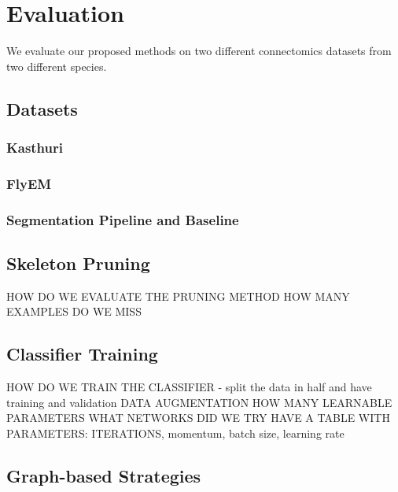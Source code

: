 \section{Evaluation}

We evaluate our proposed methods on two different connectomics datasets from two different species. 

\subsection{Datasets}

\subsubsection{Kasthuri}

\subsubsection{FlyEM}

\subsubsection{Segmentation Pipeline and Baseline}

\subsection{Skeleton Pruning}

HOW DO WE EVALUATE THE PRUNING METHOD
HOW MANY EXAMPLES DO WE MISS

\subsection{Classifier Training}

HOW DO WE TRAIN THE CLASSIFIER - split the data in half and have training and validation
DATA AUGMENTATION
HOW MANY LEARNABLE PARAMETERS
WHAT NETWORKS DID WE TRY
HAVE A TABLE WITH PARAMETERS: ITERATIONS, momentum, batch size, learning rate

\subsection{Graph-based Strategies}





